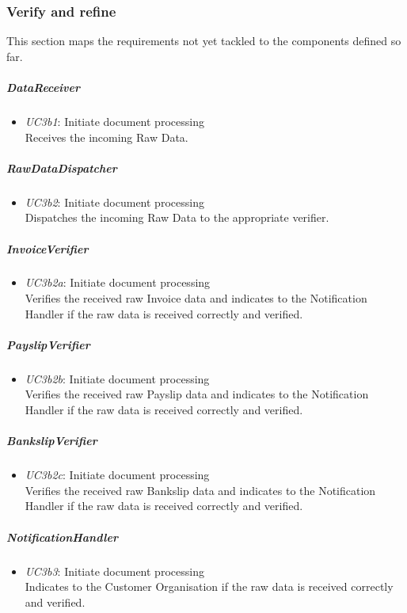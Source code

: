\documentclass[a4paper,10pt]{article}
\begin{document}
\subsubsection{Verify and refine}
This section maps the requirements not yet tackled to the components defined so far.

\subparagraph{DataReceiver}
\begin{itemize}
	\item \emph{UC3b1}: Initiate document processing\\ Receives the incoming Raw Data.
\end{itemize}

\subparagraph{RawDataDispatcher}
\begin{itemize}
	\item \emph{UC3b2}: Initiate document processing\\ Dispatches the incoming Raw Data to the appropriate verifier.
\end{itemize}

\subparagraph{InvoiceVerifier}
\begin{itemize}
	\item \emph{UC3b2a}: Initiate document processing\\ Verifies the received raw Invoice data and indicates to the Notification Handler if the raw data is received correctly and verified.
\end{itemize}

\subparagraph{PayslipVerifier}
\begin{itemize}
	\item \emph{UC3b2b}: Initiate document processing\\ Verifies the received raw Payslip data and indicates to the Notification Handler if the raw data is received correctly and verified.
\end{itemize}

\subparagraph{BankslipVerifier}
\begin{itemize}
	\item \emph{UC3b2c}: Initiate document processing\\ Verifies the received raw Bankslip data and indicates to the Notification Handler if the raw data is received correctly and verified.
\end{itemize}

\subparagraph{NotificationHandler}
\begin{itemize}
	\item \emph{UC3b3}: Initiate document processing\\ Indicates to the Customer Organisation if the raw data is received correctly and verified.
\end{itemize}
\end{document}
